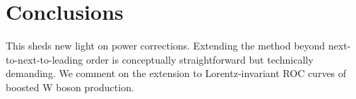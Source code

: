 \section{Conclusions}\label{sec:conclusions}

This sheds new light on power corrections. Extending the method beyond
next-to-next-to-leading order is conceptually straightforward but
technically demanding. We comment on the extension to Lorentz-invariant
ROC curves of boosted W boson production.

